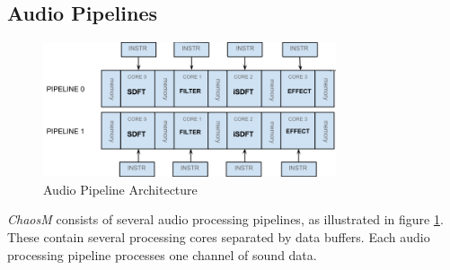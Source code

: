 \FloatBarrier
\subsection{Audio Pipelines}\label{subsec:audio_pipelines}


\begin{figure}[H]
    \centering
    \includegraphics[height=150px]{figures/fpga/system_components_general_pipeline.png}
    \caption{Audio Pipeline Architecture}
    \label{fig:pipeline_architecture}
\end{figure}

\textit{ChaosM} consists of several audio processing pipelines, as illustrated in
figure \ref{fig:pipeline_architecture}. These contain several processing cores
separated by data buffers. Each audio processing pipeline processes one channel
of sound data.

